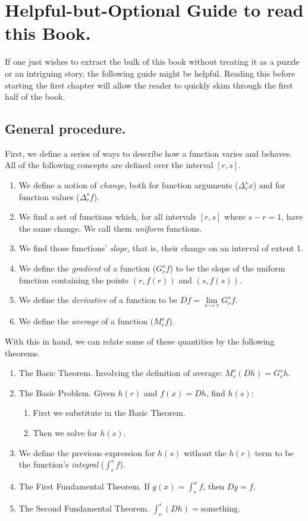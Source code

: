 \section{Helpful-but-Optional Guide to read this Book.}

If one just wishes to extract the bulk of this book without treating it as a puzzle or an intriguing story, the following guide might be helpful. Reading this before starting the first chapter will allow the reader to quickly skim through the first half of the book.

\subsection{General procedure.}

First, we define a series of ways to describe how a function varies and behaves. All of the following concepts are defined over the interval $[r, s]$.

\begin{enumerate}
	\item We define a notion of \textit{change}, both for function arguments ($\Delta_r^s x$) and for function values ($\Delta_r^s f$).
	\item We find a set of functions which, for all intervals $[r, s]$ where $s - r = 1$, have the same change. We call them \textit{uniform} functions.
	\item We find those functions' \textit{slope}, that is, their change on an interval of extent 1.
	\item We define the \textit{gradient} of a function ($G_r^s f$) to be the slope of the uniform function containing the points $(r, f(r))$ and $(s, f(s))$.
	\item We define the \textit{derivative} of a function to be $Df = \lim\limits_{s \to r} G_r^s f$.
	\item We define the \textit{average} of a function ($M_r^s f$).
\end{enumerate}

With this in hand, we can relate some of these quantities by the following theorems.

\begin{enumerate}
	\item The Basic Theorem. Involving the definition of average: $M_r^s (Dh) = G_r^s h$.
	\item The Basic Problem. Given $h(r)$ and $f(x) = Dh$, find $h(s)$:
		\begin{enumerate}
			\item First we substitute in the Basic Theorem.
			\item Then we solve for $h(s)$.
		\end{enumerate}
	\item We define the previous expression for $h(s)$ without the $h(r)$ term to be the function's \textit{integral} ($\int_r^s f$).
	\item The First Fundamental Theorem. If $g(x) = \int_r^x f$, then $Dg = f$.
	\item The Second Fundamental Theorem. $\int_r^s (Dh) = \textrm{something}$.
\end{enumerate}

